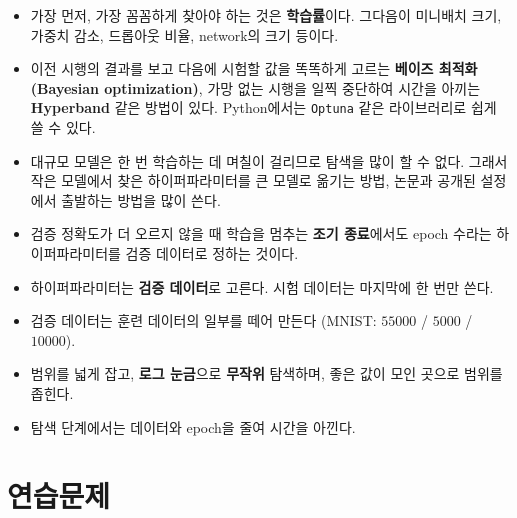 \documentclass[11pt,a4paper]{article}
\begin{document}
\begin{remarkbox}
\begin{itemize}[leftmargin=1.5em]
\item 가장 먼저, 가장 꼼꼼하게 찾아야 하는 것은 \textbf{학습률}이다.
그다음이 미니배치 크기, 가중치 감소, 드롭아웃 비율, network의 크기 등이다.
\item 이전 시행의 결과를 보고 다음에 시험할 값을 똑똑하게 고르는 \textbf{베이즈 최적화(Bayesian optimization)},
가망 없는 시행을 일찍 중단하여 시간을 아끼는 \textbf{Hyperband} 같은 방법이 있다.
Python에서는 \texttt{Optuna} 같은 라이브러리로 쉽게 쓸 수 있다.
\item 대규모 모델은 한 번 학습하는 데 며칠이 걸리므로 탐색을 많이 할 수 없다.
그래서 작은 모델에서 찾은 하이퍼파라미터를 큰 모델로 옮기는 방법,
논문과 공개된 설정에서 출발하는 방법을 많이 쓴다.
\item 검증 정확도가 더 오르지 않을 때 학습을 멈추는 \textbf{조기 종료}에서도 epoch 수라는 하이퍼파라미터를 검증 데이터로 정하는 것이다.
\end{itemize}
\end{remarkbox}

\begin{keybox}[하이퍼파라미터 찾기: 정리]
\begin{itemize}[leftmargin=1.5em]
\item 하이퍼파라미터는 \textbf{검증 데이터}로 고른다. 시험 데이터는 마지막에 한 번만 쓴다.
\item 검증 데이터는 훈련 데이터의 일부를 떼어 만든다 (MNIST: $55000$ / $5000$ / $10000$).
\item 범위를 넓게 잡고, \textbf{로그 눈금}으로 \textbf{무작위} 탐색하며, 좋은 값이 모인 곳으로 범위를 좁힌다.
\item 탐색 단계에서는 데이터와 epoch을 줄여 시간을 아낀다.
\end{itemize}
\end{keybox}

\section{연습문제}
\end{document}
